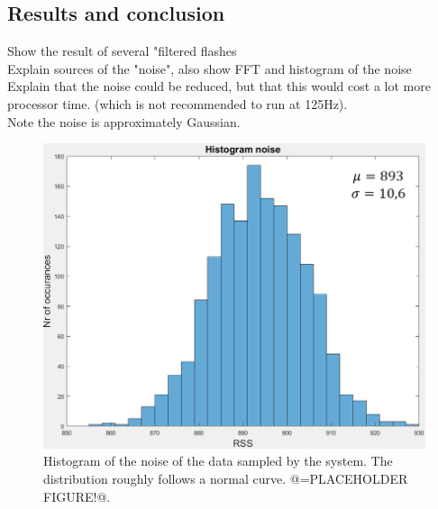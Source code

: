\subsection{Results and conclusion}
\label{sec:conclusion}
Show the result of several "filtered flashes\\
Explain sources of the "noise", also show FFT and histogram of the noise\\
Explain that the noise could be reduced, but that this would cost a lot more processor time. (which is not recommended to run at 125Hz).\\
Note the noise is approximately Gaussian.

\begin{figure}[!h]
	\includegraphics[width=\textwidth]{pics/histogram_noise_placeholder.png}
	\caption{Histogram of the noise of the data sampled by the system. The distribution roughly follows a normal curve. @=PLACEHOLDER FIGURE!@.}
	\label{fig:histogram_noise}
\end{figure}
